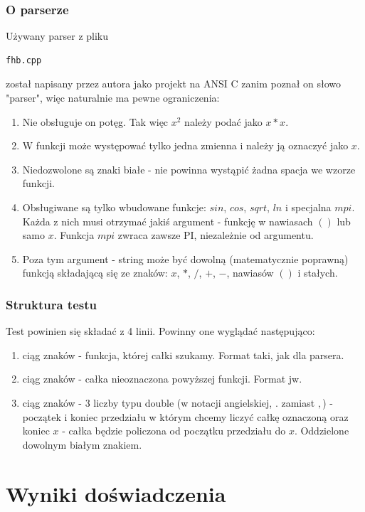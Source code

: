 \documentclass[11pt,wide]{mwart}
\begin{document}
\subsubsection{O parserze}
Używany parser z pliku
\begin{verbatim}fhb.cpp\end{verbatim}
został napisany przez autora jako projekt na ANSI C zanim poznał on słowo "parser", więc naturalnie ma pewne ograniczenia:
\begin{enumerate}
\item
  Nie obsługuje on potęg. Tak więc $x^2$ należy podać jako $x*x$.
\item
  W funkcji może występować tylko jedna zmienna i należy ją oznaczyć jako $x$.
\item
  Niedozwolone są znaki białe - nie powinna wystąpić żadna spacja we wzorze funkcji.
\item
  Obsługiwane są tylko wbudowane funkcje: $sin$, $cos$, $sqrt$, $ln$ i specjalna $mpi$. Każda z nich musi otrzymać jakiś argument - funkcję w nawiasach $( )$ lub samo $x$. Funkcja $mpi$ zwraca zawsze PI, niezależnie od argumentu.
\item
  Poza tym argument - string może być dowolną (matematycznie poprawną) funkcją składającą się ze znaków: $x$, $*$, $/$, $+$, $-$, nawiasów $( )$ i stałych.
\end{enumerate}

\subsubsection{Struktura testu}
Test powinien się składać z 4 linii. Powinny one wyglądać następująco:
\begin{enumerate}
  \item
    ciąg znaków - funkcja, której całki szukamy. Format taki, jak dla parsera.
  \item
    ciąg znaków - całka nieoznaczona powyższej funkcji. Format jw.
  \item
    ciąg znaków - 3 liczby typu double (w notacji angielskiej, $.$ zamiast $,$) - początek i koniec przedziału w którym chcemy liczyć całkę oznaczoną oraz koniec $x$ - całka będzie policzona od początku przedziału do $x$. Oddzielone dowolnym białym znakiem.
\end{enumerate}
\section{Wyniki doświadczenia}
\end{document}
